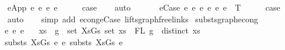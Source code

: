 \begin{isabellebody}
\isamarkupfalse%
\isanewline
\ \ \isamarkupfalse%
\ {\isacharparenleft}{\kern0pt}e{\isacharunderscore}{\kern0pt}App\ e{}\ e{}{\isacharprime}{\kern0pt}\ e{}\ e{}{\isacharprime}{\kern0pt}{\isacharparenright}{\kern0pt}\isanewline
\ \ \isamarkupfalse%
\ \isamarkupfalse%
\ {\isacharquery}{\kern0pt}case\isanewline
\ \ \isamarkupfalse%
\ auto\isanewline
\ \ \isamarkupfalse%
\isanewline
{}\isamarkupfalse%
\isanewline
\ \ \isamarkupfalse%
\ {\isacharparenleft}{\kern0pt}e{\isacharunderscore}{\kern0pt}Case\ e{}\ e{}{\isacharprime}{\kern0pt}\ e{}\ e{}{\isacharprime}{\kern0pt}\ e{}\ e{}{\isacharprime}{\kern0pt}\ {\isasymGamma}\ T{\isacharparenright}{\kern0pt}\isanewline
\ \ \isamarkupfalse%
\ \isamarkupfalse%
\ {\isacharquery}{\kern0pt}case\isanewline
\ \ \isamarkupfalse%
\ auto\isanewline
\ \ \isamarkupfalse%
\ {\isacharparenleft}{\kern0pt}simp\ add{\isacharcolon}{\kern0pt}\ econg{\isachardot}{\kern0pt}e{\isacharunderscore}{\kern0pt}Case\ lifts{\isacharunderscore}{\kern0pt}graph{\isacharunderscore}{\kern0pt}freelinks{\isacharparenright}{\kern0pt}\isanewline
{}\isamarkupfalse%
%
\endisatagproof
{\isafoldproof}%
%
\isadelimproof
\isanewline
%
\endisadelimproof
\isanewline
\isanewline
{}\isamarkupfalse%
\ substs{\isacharunderscore}{\kern0pt}graph{\isacharunderscore}{\kern0pt}econg{}{\isacharcolon}{\kern0pt}\isanewline
\ \ \ {\isachardoublequoteopen}e{}\ {\isasymsimeq}e\ e{}{\isachardoublequoteclose}\isanewline
\ \ \ {\isachardoublequoteopen}{\isasymforall}{\isacharparenleft}{\kern0pt}{\isacharparenleft}{\kern0pt}xs{\isacharcomma}{\kern0pt}\ {\isacharunderscore}{\kern0pt}{\isacharparenright}{\kern0pt}{\isacharcomma}{\kern0pt}\ g{\isacharparenright}{\kern0pt}\ {\isasymin}\ set\ XsGs{\isachardot}{\kern0pt}\ {\isacharparenleft}{\kern0pt}set\ xs\ {\isacharequal}{\kern0pt}\ FL\ g\ {\isasymand}\ distinct\ xs{\isacharparenright}{\kern0pt}{\isachardoublequoteclose}\isanewline
\ \ \ {\isachardoublequoteopen}substs\ XsGs\ e{}\ {\isasymsimeq}e\ substs\ XsGs\ e{}{\isachardoublequoteclose}\isanewline
%
\isadelimproof
%
\endisadelimproof
%
\isatagproof
{}\isamarkupfalse%

\end{isabellebody}
